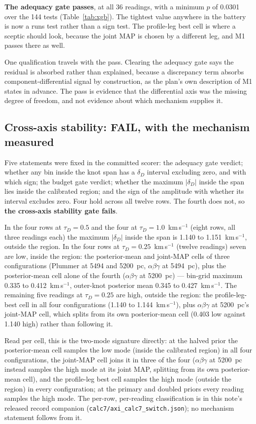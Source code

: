 \documentclass[11pt]{article}
\newcommand{\dD}{\ensuremath{\delta_D}}
\newcommand{\tD}{\ensuremath{\tau_D}}
\begin{document}
\textbf{The adequacy gate passes}, at all 36 readings, with a minimum $p$ of 0.0301 over the 144 tests (Table~\ref{tab:xgb}). The tightest value anywhere in the battery is now a runs test rather than a sign test. The profile-leg best cell is where a sceptic should look, because the joint MAP is chosen by a different leg, and M1 passes there as well.

One qualification travels with the pass. Clearing the adequacy gate says the residual is absorbed rather than explained, because a discrepancy term absorbs component-differential signal by construction, as the plan's own description of M1 states in advance. The pass is evidence that the differential axis was the missing degree of freedom, and not evidence about which mechanism supplies it.

\subsection{Cross-axis stability: FAIL, with the mechanism measured}
\label{sec:gates-c}

Five statements were fixed in the committed scorer: the adequacy gate verdict; whether any bin inside the knot span has a \dD{} interval excluding zero, and with which sign; the budget gate verdict; whether the maximum $|\dD|$ inside the span lies inside the calibrated region; and the sign of the amplitude with whether its interval excludes zero. Four hold across all twelve rows. The fourth does not, so \textbf{the cross-axis stability gate fails}.

In the four rows at $\tD = 0.5$ and the four at $\tD = 1.0$~km\,s$^{-1}$ (eight rows, all three readings each) the maximum $|\dD|$ inside the span is 1.140 to 1.151~km\,s$^{-1}$, outside the region. In the four rows at $\tD = 0.25$~km\,s$^{-1}$ (twelve readings) seven are low, inside the region: the posterior-mean and joint-MAP cells of three configurations (Plummer at 5494 and 5200~pc, $\alpha\beta\gamma$ at 5494~pc), plus the posterior-mean cell alone of the fourth ($\alpha\beta\gamma$ at 5200~pc) — bin-grid maximum 0.335 to 0.412~km\,s$^{-1}$, outer-knot posterior mean 0.345 to 0.427~km\,s$^{-1}$. The remaining five readings at $\tD = 0.25$ are high, outside the region: the profile-leg-best cell in all four configurations (1.140 to 1.144~km\,s$^{-1}$), plus $\alpha\beta\gamma$ at 5200~pc's joint-MAP cell, which splits from its own posterior-mean cell (0.403 low against 1.140 high) rather than following it.

Read per cell, this is the two-mode signature directly: at the halved prior the posterior-mean cell samples the low mode (inside the calibrated region) in all four configurations, the joint-MAP cell joins it in three of the four ($\alpha\beta\gamma$ at 5200~pc instead samples the high mode at its joint MAP, splitting from its own posterior-mean cell), and the profile-leg best cell samples the high mode (outside the region) in every configuration; at the primary and doubled priors every reading samples the high mode. The per-row, per-reading classification is in this note's released record companion (\texttt{calc7/axi\_calc7\_switch.json}); no mechanism statement follows from it.
\end{document}
